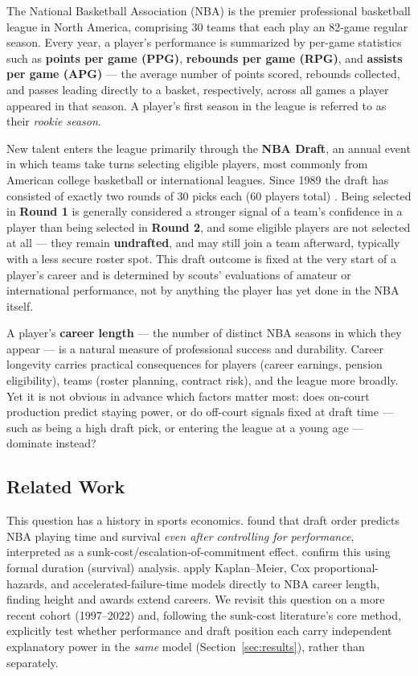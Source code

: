 \documentclass[10pt,twocolumn]{article}
\begin{document}
The National Basketball Association (NBA) is the premier professional
basketball league in North America, comprising 30 teams that each play an
82-game regular season. Every year, a player's performance is summarized
by per-game statistics such as \textbf{points per game (PPG)},
\textbf{rebounds per game (RPG)}, and \textbf{assists per game (APG)} ---
the average number of points scored, rebounds collected, and passes
leading directly to a basket, respectively, across all games a player
appeared in that season. A player's first season in the league is
referred to as their \textit{rookie season}.

New talent enters the league primarily through the \textbf{NBA Draft}, an
annual event in which teams take turns selecting eligible players, most
commonly from American college basketball or international leagues. Since
1989 the draft has consisted of exactly two rounds of 30 picks each
(60 players total) \citep{sleeper2024draft}. Being selected in
\textbf{Round 1} is generally considered a stronger signal of a team's
confidence in a player than being selected in \textbf{Round 2}, and some
eligible players are not selected at all --- they remain
\textbf{undrafted}, and may still join a team afterward, typically with a
less secure roster spot. This draft outcome is fixed at the very start of
a player's career and is determined by scouts' evaluations of amateur or
international performance, not by anything the player has yet done in the
NBA itself.

A player's \textbf{career length} --- the number of distinct NBA seasons
in which they appear --- is a natural measure of professional success and
durability. Career longevity carries practical consequences for players
(career earnings, pension eligibility), teams (roster planning, contract
risk), and the league more broadly. Yet it is not obvious in advance
which factors matter most: does on-court production predict staying
power, or do off-court signals fixed at draft time --- such as being a
high draft pick, or entering the league at a young age --- dominate
instead?

\subsection{Related Work}
This question has a history in sports economics. \citet{staw1995sunk}
found that draft order predicts NBA playing time and survival
\textit{even after controlling for performance}, interpreted as a
sunk-cost/escalation-of-commitment effect. \citet{groothuis2004exit}
confirm this using formal duration (survival) analysis.
\citet{fynn2012analysis} apply Kaplan--Meier, Cox proportional-hazards,
and accelerated-failure-time models directly to NBA career length,
finding height and awards extend careers. We revisit this question on
a more recent cohort (1997--2022) and, following the sunk-cost
literature's core method, explicitly test whether performance and
draft position each carry independent explanatory power in the
\textit{same} model (Section~\ref{sec:results}), rather than separately.
\end{document}
